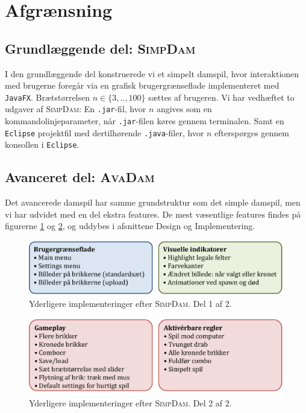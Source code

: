 \section{Afgrænsning}\label{sec:afgraensning}

\subsection{Grundlæggende del: \textsc{SimpDam}}
I den grundlæggende del konstruerede vi et simpelt damspil, hvor interaktionen med brugerne foregår via en grafisk brugergrænseflade implementeret med \texttt{JavaFX}. Brætstørrelsen $n \in \{3, .. , 100\}$ sættes af brugeren. Vi har vedhæftet to udgaver af \textsc{SimpDam}: En \texttt{.jar}-fil, hvor $n$ angives som en kommandolinjeparameter, når \texttt{.jar}-filen køres gennem terminalen. Samt en \texttt{Eclipse} projektfil med dertilhørende \texttt{.java}-filer, hvor $n$ efterspørges gennem konsollen i \texttt{Eclipse}.

\subsection{Avanceret del: \textsc{AvaDam}}

Det avancerede damspil har samme grundstruktur som det simple damspil, men vi har udvidet med en del ekstra features. De mest væsentlige features findes på figurerne \ref{fig:features1} og \ref{fig:features2}, og uddybes i afsnittene Design og Implementering. \\
\begin{figure}[H]
\centering
\includegraphics[width = 1.0  \textwidth]{Figurer/features1.pdf}
\caption{Yderligere implementeringer efter \textsc{SimpDam}. Del 1 af 2.}
\label{fig:features1}
\end{figure}

\begin{figure}[H]
\centering
\includegraphics[width = 1.0  \textwidth]{Figurer/features2.pdf}
\caption{Yderligere implementeringer efter \textsc{SimpDam}. Del 2 af 2.}
\label{fig:features2}
\end{figure}
